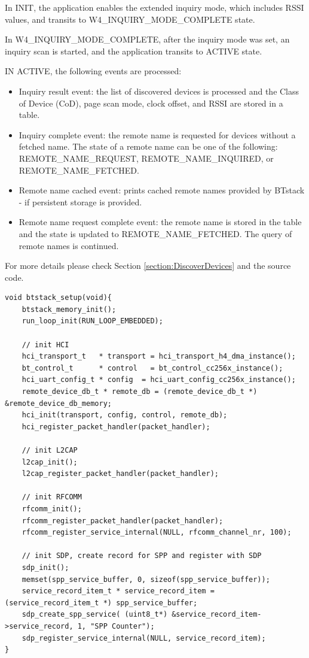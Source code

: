 \documentclass[a4paper,titlepage,oneside,12pt]{amsart} %
\begin{document}
In INIT, the application enables the extended inquiry mode, which includes RSSI values, and transits to W4\_INQUIRY\_MODE\_COMPLETE state.

In W4\_INQUIRY\_MODE\_COMPLETE, after the inquiry mode was set, an inquiry scan is started, and the application transits to ACTIVE state. 

IN ACTIVE, the following events are processed:
\begin{itemize}
\item Inquiry result event: the list of discovered devices is processed and the Class of Device (CoD), page scan mode, clock offset, and RSSI are stored in a table.
\item Inquiry complete event: the remote name is requested for devices without a fetched name. The state of a remote name can be one of the following: REMOTE\_NAME\_REQUEST, REMOTE\_NAME\_INQUIRED, or REMOTE\_NAME\_FETCHED.
\item Remote name cached event: prints cached remote names provided by BTstack - if persistent storage is provided.
\item Remote name request complete event: the remote name is stored in the table and the state is updated to REMOTE\_NAME\_FETCHED. The query of remote names is continued.
\end{itemize}

For more details please check Section \ref{section:DiscoverDevices} and the source code.


\begin{lstlisting}[float, caption=SPP service setup, label=SPPSetup]
void btstack_setup(void){
    btstack_memory_init();
    run_loop_init(RUN_LOOP_EMBEDDED);
    
    // init HCI
    hci_transport_t   * transport = hci_transport_h4_dma_instance();
    bt_control_t      * control   = bt_control_cc256x_instance();
    hci_uart_config_t * config  = hci_uart_config_cc256x_instance();
    remote_device_db_t * remote_db = (remote_device_db_t *) &remote_device_db_memory;
    hci_init(transport, config, control, remote_db);
    hci_register_packet_handler(packet_handler);
    
    // init L2CAP
    l2cap_init();
    l2cap_register_packet_handler(packet_handler);
    
    // init RFCOMM
    rfcomm_init();
    rfcomm_register_packet_handler(packet_handler);
    rfcomm_register_service_internal(NULL, rfcomm_channel_nr, 100); 

    // init SDP, create record for SPP and register with SDP
    sdp_init();
    memset(spp_service_buffer, 0, sizeof(spp_service_buffer));
    service_record_item_t * service_record_item = (service_record_item_t *) spp_service_buffer;
    sdp_create_spp_service( (uint8_t*) &service_record_item->service_record, 1, "SPP Counter");
    sdp_register_service_internal(NULL, service_record_item);   
}
\end{lstlisting}
\end{document}
